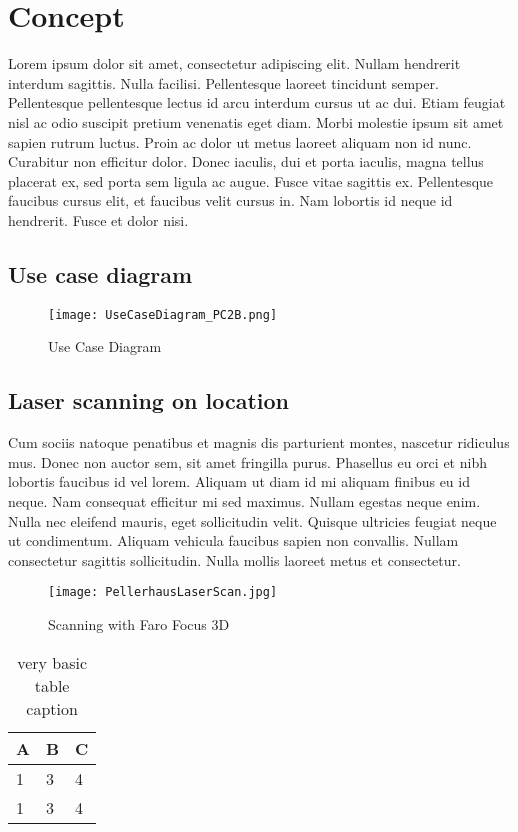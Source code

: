 \section{Concept}

Lorem ipsum dolor sit amet, consectetur adipiscing elit. Nullam hendrerit interdum sagittis. Nulla facilisi. Pellentesque laoreet tincidunt semper. Pellentesque pellentesque lectus id arcu interdum cursus ut ac dui. Etiam feugiat nisl ac odio suscipit pretium venenatis eget diam. Morbi molestie ipsum sit amet sapien rutrum luctus. Proin ac dolor ut metus laoreet aliquam non id nunc. Curabitur non efficitur dolor. Donec iaculis, dui et porta iaculis, magna tellus placerat ex, sed porta sem ligula ac augue. Fusce vitae sagittis ex. Pellentesque faucibus cursus elit, et faucibus velit cursus in. Nam lobortis id neque id hendrerit. Fusce et dolor nisi.


\subsection{Use case diagram}

\begin{figure}[h]
	\centering
	\texttt{[image: UseCaseDiagram\_PC2B.png]}
	\caption{Use Case Diagram}
	\label{fig:use_case}
\end{figure}


\subsection{Laser scanning on location}

Cum sociis natoque penatibus et magnis dis parturient montes, nascetur ridiculus mus. Donec non auctor sem, sit amet fringilla purus. Phasellus eu orci et nibh lobortis faucibus id vel lorem. Aliquam ut diam id mi aliquam finibus eu id neque. Nam consequat efficitur mi sed maximus. Nullam egestas neque enim. Nulla nec eleifend mauris, eget sollicitudin velit. Quisque ultricies feugiat neque ut condimentum. Aliquam vehicula faucibus sapien non convallis. Nullam consectetur sagittis sollicitudin. Nulla mollis laoreet metus et consectetur.

\begin{figure}[h]
	\centering
	\texttt{[image: PellerhausLaserScan.jpg]}
	\caption{Scanning with Faro Focus 3D}
	\label{fig:laser_scanning_on_location}
\end{figure}



\begin{table}[h]
	\centering
	\begin{tabular}{l | l | l}
		A & B & C \\
		\hline
		1 & 3 & 4 \\
		1 & 3 & 4 \\
	\end{tabular}
	\caption{very basic table caption}
	\label{tab:abc}
\end{table}



